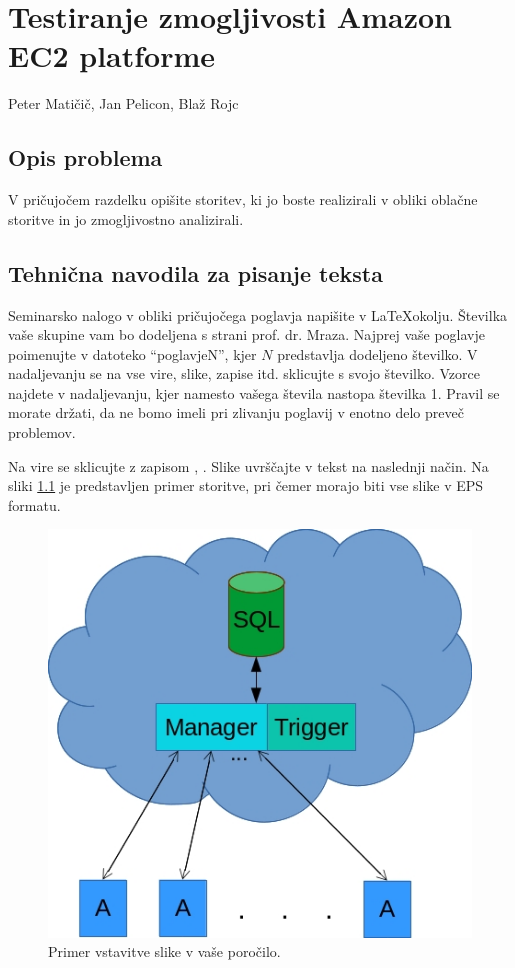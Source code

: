 \chapter[Testiranje zmogljivosti Amazon EC2 platforme (P. Matičič, J. Pelicon, B. Rojc)]{Testiranje zmogljivosti Amazon EC2 platforme}

\pagestyle{fancy}
\fancyhf{}
\fancyhead[LE,RO]{\thepage}
\fancyhead[RE,LO]{\leftmark}

\huge Peter Matičič, Jan Pelicon, Blaž Rojc
\normalsize
\bigskip

\section{Opis problema}
V pričujočem razdelku opišite storitev, ki jo boste realizirali v obliki oblačne storitve in jo zmogljivostno analizirali. 

\section{Tehnična navodila za pisanje teksta}
Seminarsko nalogo v obliki pričujočega poglavja napišite v \LaTeX okolju. Številka vaše skupine vam bo dodeljena s strani prof. dr. Mraza. Najprej vaše poglavje poimenujte v datoteko "`poglavjeN"', kjer $N$ predstavlja dodeljeno številko. V nadaljevanju se na vse vire, slike, zapise itd. sklicujte s svojo številko. Vzorce najdete v nadaljevanju, kjer namesto vašega števila nastopa številka 1. Pravil se morate držati, da ne bomo imeli pri zlivanju poglavij v enotno delo preveč problemov.

Na vire se sklicujte z zapisom \cite{1_dOcean}, \cite{1_greenwade93}. Slike uvrščajte v tekst na naslednji način. Na sliki \ref{fig:1_osnovnaShema} je predstavljen primer storitve, pri čemer morajo biti vse slike v EPS formatu.
\begin{figure}[H]
    \centering
    \includegraphics[scale=0.75]{Img/1_shema.jpg}
    \caption{Primer vstavitve slike v vaše poročilo.}
    \label{fig:1_osnovnaShema}
\end{figure}

